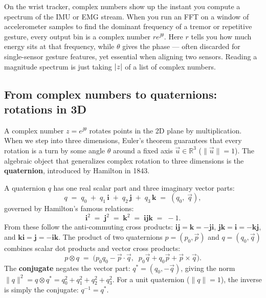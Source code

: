 \begin{goalbox}
On the wrist tracker, complex numbers show up the instant you compute a spectrum of the IMU or
EMG stream. When you run an FFT on a window of accelerometer samples to find the dominant
frequency of a tremor or repetitive gesture, every output bin is a complex number $r
e^{\jj\theta}$. Here $r$ tells you how much energy sits at that frequency, while $\theta$ gives
the phase --- often discarded for single-sensor gesture features, yet essential when aligning two
sensors. Reading a magnitude spectrum is just taking $\lvert z\rvert$ of a list of complex numbers.
\end{goalbox}

\subsection{From complex numbers to quaternions: rotations in 3D}
\label{ch42:quaternions}

A complex number $z = e^{\jj\theta}$ rotates points in the 2D plane by multiplication.
When we step into three dimensions, Euler's theorem guarantees that every rotation is
a turn by some angle $\theta$ around a fixed axis $\vec{u} \in \mathbb{R}^3$ ($\|\vec{u}\|=1$).
The algebraic object that generalizes complex rotation to three dimensions is the
\textbf{quaternion}, introduced by Hamilton in 1843.

A quaternion $q$ has one real scalar part and three imaginary vector parts:
\begin{equation}
\label{ch42:eq-quat-def}
  q \;=\; q_0 \;+\; q_1\,\mathbf{i} \;+\; q_2\,\mathbf{j} \;+\; q_3\,\mathbf{k}
    \;=\; (q_0,\; \vec{q}),
\end{equation}
governed by Hamilton's famous relations:
\begin{equation}
\label{ch42:eq-hamilton}
  \mathbf{i}^2 \;=\; \mathbf{j}^2 \;=\; \mathbf{k}^2 \;=\; \mathbf{i}\mathbf{j}\mathbf{k} \;=\; -1.
\end{equation}
From these follow the anti-commuting cross products: $\mathbf{i}\mathbf{j} = \mathbf{k} = -\mathbf{j}\mathbf{i}$,
$\mathbf{j}\mathbf{k} = \mathbf{i} = -\mathbf{k}\mathbf{j}$, and $\mathbf{k}\mathbf{i} = \mathbf{j} = -\mathbf{i}\mathbf{k}$.
The product of two quaternions $p = (p_0, \vec{p})$ and $q = (q_0, \vec{q})$ combines scalar dot
products and vector cross products:
\begin{equation}
\label{ch42:eq-quat-prod}
  p \otimes q \;=\; \big(p_0 q_0 - \vec{p}\cdot\vec{q},\;\; p_0\vec{q} + q_0\vec{p} + \vec{p}\times\vec{q}\big).
\end{equation}
The \textbf{conjugate} negates the vector part: $q^* = (q_0, -\vec{q})$, giving the norm
$\|q\|^2 = q \otimes q^* = q_0^2 + q_1^2 + q_2^2 + q_3^2$. For a unit quaternion ($\|q\|=1$), the
inverse is simply the conjugate: $q^{-1} = q^*$.

